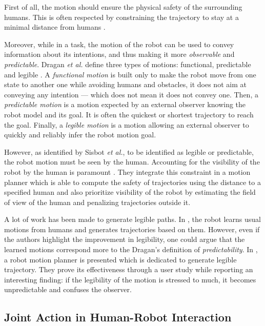 \documentclass[a4paper,11pt,twoside]{StyleThese}
\begin{document}
First of all, the motion should ensure the physical safety of the surrounding humans. This is often respected by constraining the trajectory to stay at a minimal distance from humans \cite{kruse_human-aware_2013, rios2015proxemics}.

Moreover, while in a task, the motion of the robot can be used to convey information about its intentions, and thus making it more \textit{observable} and \textit{predictable}. Dragan \textit{et al.} define three types of motions: functional, predictable and legible \cite{dragan2015effects}. A \textit{functional motion} is built only to make the robot move from one state to another one while avoiding humans and obstacles, it does not aim at conveying any intention --- which does not mean it does not convey one. Then, a \textit{predictable motion} is a motion expected by an external observer knowing the robot model and its goal. It is often the quickest or shortest trajectory to reach the goal. Finally, a \textit{legible motion} is a motion allowing an external observer to quickly and reliably infer the robot motion goal.

However, as identified by Sisbot \textit{et al.}, to be identified as legible or predictable, the robot motion must be seen by the human. Accounting for the visibility of the robot by the human is paramount \cite{sisbot_human_2007}.  They integrate this constraint in a motion planner which is able to compute the safety of trajectories using the distance to a specified human and also prioritize visibility of the robot by estimating the field of view of the human and penalizing trajectories outside it.

A lot of work has been made to generate legible paths. In \cite{beetz2010generality}, the robot learns usual motions from humans and generates trajectories based on them. However, even if the authors highlight the improvement in legibility, one could argue that the learned motions correspond more to the Dragan's definition of \textit{predictability}. In \cite{dragan_legibility_2013}, a robot motion planner is presented which is dedicated to generate legible trajectory. They prove its effectiveness through a user study while reporting an interesting finding: if the legibility of the motion is stressed to much, it becomes unpredictable and confuses the observer.




\subsection{Joint Action in Human-Robot Interaction}
\end{document}
